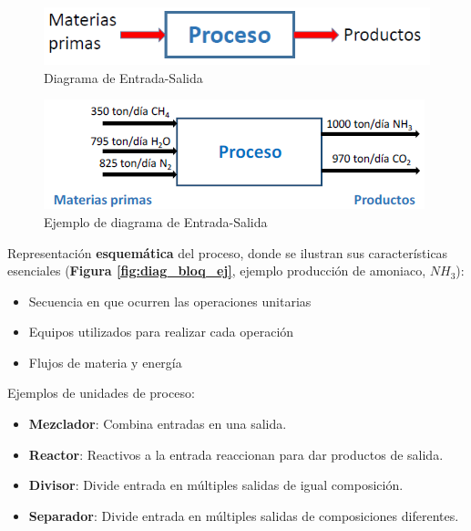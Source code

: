             \begin{figure}
                \centering
                \includegraphics[width=.6\textwidth]{img/esquemas/diagrama_e-s.png}
                \caption{Diagrama de Entrada-Salida}
                \label{fig:diag-e-s}
            \end{figure}
            
            \begin{figure}
                \centering
                \includegraphics[width=.6\textwidth]{img/esquemas/diagrama_e-s_ej.png}
                \caption{Ejemplo de diagrama de Entrada-Salida}
                \label{fig:diag-e-s_ej}
            \end{figure}
            
            
            Representación \textbf{esquemática} del proceso, donde se ilustran sus características esenciales (\textbf{Figura \ref{fig:diag_bloq_ej}}, ejemplo producción de amoniaco, \(NH_{3}\)):
            
            \begin{itemize}
                \item Secuencia en que ocurren las operaciones unitarias
                \item Equipos utilizados para realizar cada operación
                \item Flujos de materia y energía
            \end{itemize}
            
            Ejemplos de unidades de proceso:
            
            \begin{itemize}
                \item \textbf{Mezclador}: Combina entradas en una salida.
                \item \textbf{Reactor}: Reactivos a la entrada reaccionan para dar productos de salida.
                \item \textbf{Divisor}: Divide entrada en múltiples salidas de igual composición.
                \item \textbf{Separador}: Divide entrada en múltiples salidas de composiciones diferentes.
            \end{itemize}
            
